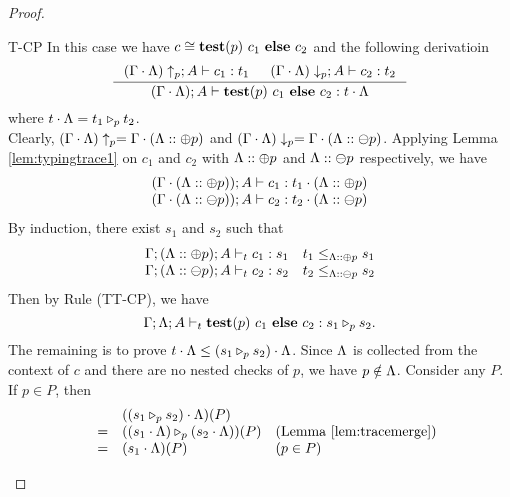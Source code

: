 {{{\begin{proof}
\begin{ProofEnumDesc}
\item[T-CP] In this case we have $c\cong \lcCP{p}{c_1}{c_2}$ and the following derivatioin
\begin{equation*}
\inference
{(\Gamma\cdot\trace)\uparrow_{p};  A \vdash c_1 : t_1 &
(\Gamma\cdot\trace)\downarrow_{p}; A \vdash c_2 : t_2}
{(\Gamma\cdot\trace);A\vdash \lcCP{p}{c_1}{c_2} : t\cdot \trace}
\end{equation*}
where $t\cdot \trace = \omerge{p}{t_1}{t_2}$.\\

Clearly,
$(\Gamma\cdot \trace)\uparrow_{p}= \Gamma\cdot (\trace::\tplus{p})$
and $(\Gamma\cdot \trace)\downarrow_{p}= \Gamma\cdot (\trace::\tminus{p})$.
Applying Lemma \ref{lem:typingtrace1} on $c_1$ and $c_2$ with $\trace::\tplus  {p}$ and $ \trace::\tminus{p}$ respectively, we have
\begin{equation*}
\begin{array}{l}
(\Gamma\cdot(\trace::\tplus  {p})); A \vdash c_1 : t_1\cdot(\trace::\tplus  {p})\\
(\Gamma\cdot (\trace::\tminus {p})); A \vdash c_2 : t_2\cdot(\trace::\tminus  {p})
\end{array}
\end{equation*}
By induction, there exist $s_1$ and $s_2$ such that
\begin{equation*}
\begin{array}{l}
\Gamma; (\trace :: \tplus {p});  A \vdash_{t} c_1 : s_1\quad
t_1 \leq_{\trace::\tplus p} s_1 \\
\Gamma; (\trace:: \tminus {p});  A \vdash_{t} c_2 : s_2\quad
t_2 \leq_{\trace::\tminus p} s_2
\end{array}
\end{equation*}
Then by Rule {(TT-CP)}, we have
$$
\Gamma;\trace;A\vdash_{t} \lcCP{p}{c_1}{c_2} : \omerge{p}{s_1}{s_2}.
$$
The remaining is to prove $t\cdot\trace \leq (\omerge{p}{s_1}{s_2})\cdot\trace$.
Since $\trace$ is collected from the context of $c$ and there are no nested checks of $p$, we have $p \notin \trace$.
Consider any $P$. If $p \in P$, then
$$
\begin{array}{rlll}
&&((\omerge{p}{s_1}{s_2})\cdot\trace)(P) &\\
&=&(\omerge{p}{(s_1\cdot\trace)}{(s_2\cdot\trace)})(P) &(\textrm{Lemma \ref{lem:tracemerge}})\\
&=&(s_1\cdot\trace)(P) & (p\in P)\\

\end{array}$$
\end{ProofEnumDesc}
\end{proof}}}}
